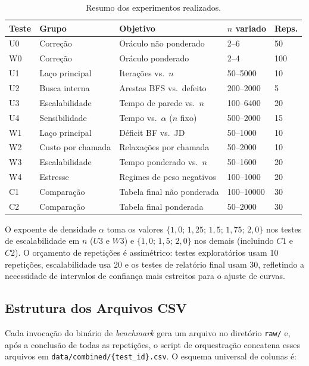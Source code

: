 \documentclass{infufrgs}
\begin{document}
\begin{table}[H]
\centering
\caption{Resumo dos experimentos realizados.}
\label{tab:experimentos}
\begin{tabular}{lllll}
\toprule
\textbf{Teste} & \textbf{Grupo} & \textbf{Objetivo} & \textbf{$n$ variado} & \textbf{Reps.} \\
\midrule
U0 & Correção & Oráculo não ponderado & 2--6 & 50 \\
W0 & Correção & Oráculo ponderado & 2--4 & 100 \\
U1 & Laço principal & Iterações vs.\ $n$ & 50--5000 & 10 \\
U2 & Busca interna & Arestas BFS vs.\ defeito & 200--2000 & 5 \\
U3 & Escalabilidade & Tempo de parede vs.\ $n$ & 100--6400 & 20 \\
U4 & Sensibilidade & Tempo vs.\ $\alpha$ ($n$ fixo) & 500--2000 & 15 \\
W1 & Laço principal & Déficit BF vs.\ JD & 50--1000 & 10 \\
W2 & Custo por chamada & Relaxações por chamada & 50--2000 & 10 \\
W3 & Escalabilidade & Tempo ponderado vs.\ $n$ & 50--1600 & 20 \\
W4 & Estresse & Regimes de peso negativos & 100--1000 & 20 \\
C1 & Comparação & Tabela final não ponderada & 100--10000 & 30 \\
C2 & Comparação & Tabela final ponderada & 50--2000 & 30 \\
\bottomrule
\end{tabular}
\end{table}

O expoente de densidade $\alpha$ toma os valores $\{1{,}0;\, 1{,}25;\, 1{,}5;\, 1{,}75;\, 2{,}0\}$ nos testes de escalabilidade em $n$ ($U3$ e $W3$) e $\{1{,}0;\, 1{,}5;\, 2{,}0\}$ nos demais (incluindo $C1$ e $C2$). O orçamento de repetições é assimétrico: testes exploratórios usam 10 repetições, escalabilidade usa 20 e os testes de relatório final usam 30, refletindo a necessidade de intervalos de confiança mais estreitos para o ajuste de curvas.

\subsection{Estrutura dos Arquivos CSV}

Cada invocação do binário de \emph{benchmark} gera um arquivo no diretório \texttt{raw/} e, após a conclusão de todas as repetições, o script de orquestração concatena esses arquivos em \texttt{data/combined/\{test\_id\}.csv}. O esquema universal de colunas é:
\end{document}
